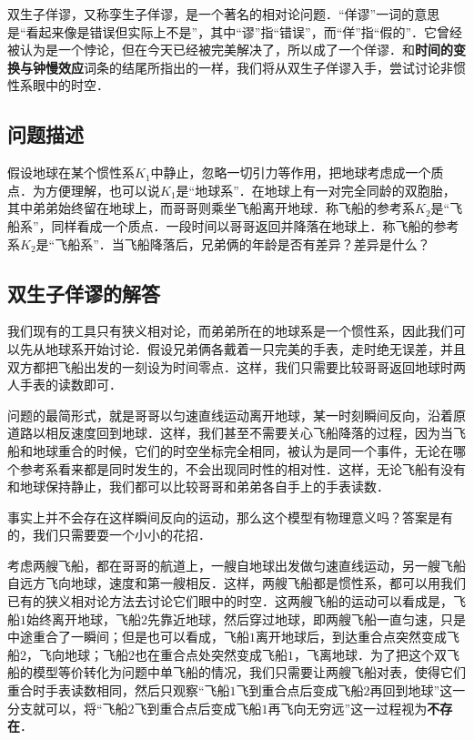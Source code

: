 
双生子佯谬，又称孪生子佯谬，是一个著名的相对论问题．“佯谬”一词的意思是“看起来像是错误但实际上不是”，其中“谬”指“错误”，而“佯”指“假的”．它曾经被认为是一个悖论，但在今天已经被完美解决了，所以成了一个佯谬．和\textbf{时间的变换与钟慢效应}词条的结尾所指出的一样，我们将从双生子佯谬入手，尝试讨论非惯性系眼中的时空．

\subsection{问题描述}

假设地球在某个惯性系$K_1$中静止，忽略一切引力等作用，把地球考虑成一个质点．为方便理解，也可以说$K_1$是“地球系”．在地球上有一对完全同龄的双胞胎，其中弟弟始终留在地球上，而哥哥则乘坐飞船离开地球．称飞船的参考系$K_2$是“飞船系”，同样看成一个质点．一段时间以哥哥返回并降落在地球上．称飞船的参考系$K_2$是“飞船系”．当飞船降落后，兄弟俩的年龄是否有差异？差异是什么？

\subsection{双生子佯谬的解答}

我们现有的工具只有狭义相对论，而弟弟所在的地球系是一个惯性系，因此我们可以先从地球系开始讨论．假设兄弟俩各戴着一只完美的手表，走时绝无误差，并且双方都把飞船出发的一刻设为时间零点．这样，我们只需要比较哥哥返回地球时两人手表的读数即可．

问题的最简形式，就是哥哥以匀速直线运动离开地球，某一时刻瞬间反向，沿着原道路以相反速度回到地球．这样，我们甚至不需要关心飞船降落的过程，因为当飞船和地球重合的时候，它们的时空坐标完全相同，被认为是同一个事件，无论在哪个参考系看来都是同时发生的，不会出现同时性的相对性．这样，无论飞船有没有和地球保持静止，我们都可以比较哥哥和弟弟各自手上的手表读数．

事实上并不会存在这样瞬间反向的运动，那么这个模型有物理意义吗？答案是有的，我们只需要耍一个小小的花招．

考虑两艘飞船，都在哥哥的航道上，一艘自地球出发做匀速直线运动，另一艘飞船自远方飞向地球，速度和第一艘相反．这样，两艘飞船都是惯性系，都可以用我们已有的狭义相对论方法去讨论它们眼中的时空．这两艘飞船的运动可以看成是，飞船$1$始终离开地球，飞船$2$先靠近地球，然后穿过地球，即两艘飞船一直匀速，只是中途重合了一瞬间；但是也可以看成，飞船$1$离开地球后，到达重合点突然变成飞船$2$，飞向地球；飞船$2$也在重合点处突然变成飞船$1$，飞离地球．为了把这个双飞船的模型等价转化为问题中单飞船的情况，我们只需要让两艘飞船对表，使得它们重合时手表读数相同，然后只观察“飞船$1$飞到重合点后变成飞船$2$再回到地球”这一分支就可以，将“飞船$2$飞到重合点后变成飞船$1$再飞向无穷远”这一过程视为\textbf{不存在}．

